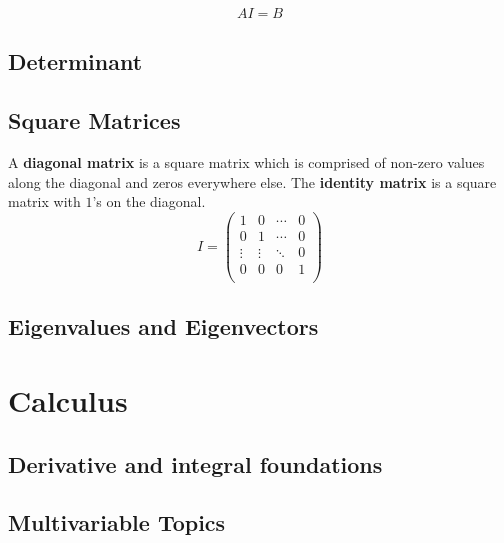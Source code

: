 \documentclass[10pt,a4paper,fleqn]{article} %
\begin{document}
\begin{equation}
    A I = B
\end{equation}

\subsection{Determinant} %

\subsection{Square Matrices} %
A \textbf{diagonal matrix} is a square matrix which is comprised of non-zero values
along the diagonal and zeros everywhere else.
The \textbf{identity matrix} is a square matrix with $1$'s on the diagonal.
\begin{equation}
    I = \begin{pmatrix}
        1 & 0 & \cdots & 0 \\
        0 & 1 & \cdots & 0 \\
        \vdots & \vdots & \ddots & 0 \\
        0 & 0 & 0 & 1 \\
    \end{pmatrix}    
\end{equation}

\subsection{Eigenvalues and Eigenvectors} %


\section{Calculus} %

\subsection{Derivative and integral foundations} %

\subsection{Multivariable Topics} %
\end{document}
